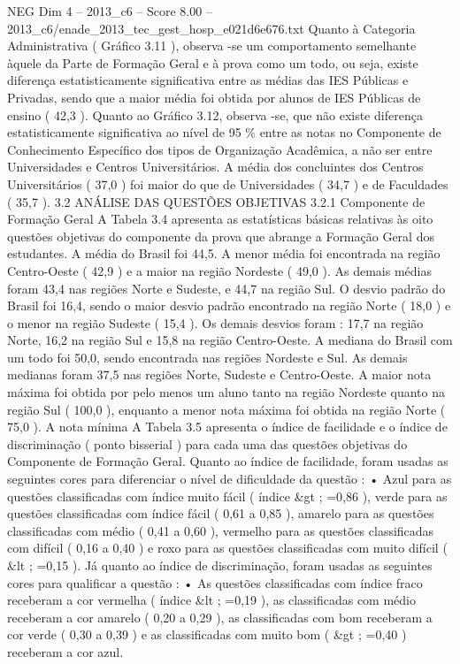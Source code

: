 \begin{textsample}{NEG Dim 4 – 2013\_c6 – Score 8.00 – 2013\_c6/enade\_2013\_tec\_gest\_hosp\_e021d6e676.txt}
Quanto à Categoria Administrativa ( Gráfico 3.11 ), observa -se um comportamento semelhante àquele da Parte de Formação Geral e à prova como um todo, ou seja, existe diferença estatisticamente significativa entre as médias das IES Públicas e Privadas, sendo que a maior média foi obtida por alunos de IES Públicas de ensino ( 42,3 ).
Quanto ao Gráfico 3.12, observa -se, que não existe diferença estatisticamente significativa ao nível de 95 \% entre as notas no Componente de Conhecimento Específico dos tipos de Organização Acadêmica, a não ser entre Universidades e Centros Universitários.
A média dos concluintes dos Centros Universitários ( 37,0 ) foi maior do que de Universidades ( 34,7 ) e de Faculdades ( 35,7 ). 3.2 ANÁLISE DAS QUESTÕES OBJETIVAS 3.2.1 Componente de Formação Geral A Tabela 3.4 apresenta as estatísticas básicas relativas às oito questões objetivas do componente da prova que abrange a Formação Geral dos estudantes.
A média do Brasil foi 44,5.
A menor média foi encontrada na região Centro-Oeste ( 42,9 ) e a maior na região Nordeste ( 49,0 ).
As demais médias foram 43,4 nas regiões Norte e Sudeste, e 44,7 na região Sul.
O desvio padrão do Brasil foi 16,4, sendo o maior desvio padrão encontrado na região Norte ( 18,0 ) e o menor na região Sudeste ( 15,4 ).
Os demais desvios foram : 17,7 na região Norte, 16,2 na região Sul e 15,8 na região Centro-Oeste.
A mediana do Brasil com um todo foi 50,0, sendo encontrada nas regiões Nordeste e Sul.
As demais medianas foram 37,5 nas regiões Norte, Sudeste e Centro-Oeste.
A maior nota máxima foi obtida por pelo menos um aluno tanto na região Nordeste quanto na região Sul ( 100,0 ), enquanto a menor nota máxima foi obtida na região Norte ( 75,0 ).
A nota mínima A Tabela 3.5 apresenta o índice de facilidade e o índice de discriminação ( ponto bisserial ) para cada uma das questões objetivas do Componente de Formação Geral.
Quanto ao índice de facilidade, foram usadas as seguintes cores para diferenciar o nível de dificuldade da questão : • Azul para as questões classificadas com índice muito fácil ( índice \&gt ; =0,86 ), verde para as questões classificadas com índice fácil ( 0,61 a 0,85 ), amarelo para as questões classificadas com médio ( 0,41 a 0,60 ), vermelho para as questões classificadas com difícil ( 0,16 a 0,40 ) e roxo para as questões classificadas com muito difícil ( \&lt ; =0,15 ).
Já quanto ao índice de discriminação, foram usadas as seguintes cores para qualificar a questão : • As questões classificadas com índice fraco receberam a cor vermelha ( índice \&lt ; =0,19 ), as classificadas com médio receberam a cor amarelo ( 0,20 a 0,29 ), as classificadas com bom receberam a cor verde ( 0,30 a 0,39 ) e as classificadas com muito bom ( \&gt ; =0,40 ) receberam a cor azul.

\end{textsample}

